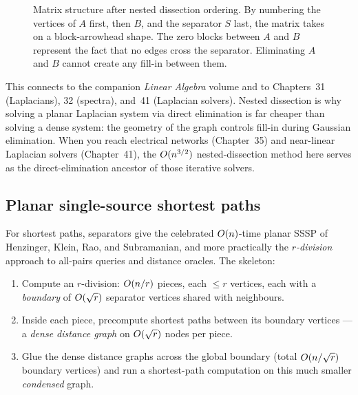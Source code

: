\begin{figure}[htbp]
\centering
{}
\caption{Matrix structure after nested dissection ordering. By numbering the vertices of $A$ first, then $B$, and the separator $S$ last, the matrix takes on a block-arrowhead shape. The zero blocks between $A$ and $B$ represent the fact that no edges cross the separator. Eliminating $A$ and $B$ cannot create any fill-in between them.}
\label{ch27:fig-nd-matrix}
\end{figure}

\begin{connectionbox}
This connects to the companion \emph{Linear Algebra} volume and to Chapters~31 (Laplacians), 32 (spectra), and~41 (Laplacian solvers). Nested dissection is why solving a planar Laplacian system via direct elimination is far cheaper than solving a dense system: the geometry of the graph controls fill-in during Gaussian elimination. When you reach electrical networks (Chapter~35) and near-linear Laplacian solvers (Chapter~41), the $O(n^{3/2})$ nested-dissection method here serves as the direct-elimination ancestor of those iterative solvers.
\end{connectionbox}

\subsection{Planar single-source shortest paths}

For shortest paths, separators give the celebrated $O(n)$-time planar SSSP of Henzinger, Klein, Rao, and Subramanian, and more practically the \emph{$r$-division} approach to all-pairs queries and distance oracles. The skeleton:

\begin{enumerate}
  \item Compute an $r$-division: $O(n/r)$ pieces, each $\le r$ vertices, each with a \emph{boundary} of $O(\sqrt r)$ separator vertices shared with neighbours.
  \item Inside each piece, precompute shortest paths between its boundary vertices --- a \emph{dense distance graph} on $O(\sqrt r)$ nodes per piece.
  \item Glue the dense distance graphs across the global boundary (total $O(n/\sqrt r)$ boundary vertices) and run a shortest-path computation on this much smaller \emph{condensed} graph.
\end{enumerate}

